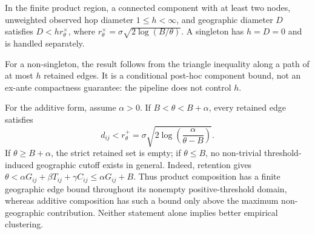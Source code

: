 \documentclass[runningheads]{llncs}
\begin{document}
\begin{corollary}
In the finite product region, a connected component with at least two nodes,
unweighted observed hop diameter $1\leq h<\infty$, and geographic diameter
$D$ satisfies $D<hr_\theta^\times$, where
$r_\theta^\times=\sigma\sqrt{2\log(B/\theta)}$. A singleton has $h=D=0$ and
is handled separately.
\end{corollary}
For a non-singleton, the result follows from the triangle inequality along a
path of at most $h$ retained edges. It is a conditional post-hoc component
bound, not an ex-ante compactness guarantee: the pipeline does not control
$h$.

For the additive form, assume $\alpha>0$. If
$B<\theta<B+\alpha$, every retained edge satisfies
\[
d_{ij}<r_\theta^+
=\sigma\sqrt{2\log\!\left(\frac{\alpha}{\theta-B}\right)}.
\]
If $\theta\ge B+\alpha$, the strict retained set is empty; if
$\theta\le B$, no non-trivial threshold-induced geographic cutoff exists in
general. Indeed, retention gives
$\theta<\alpha G_{ij}+\beta T_{ij}+\gamma C_{ij}\le\alpha G_{ij}+B$.
Thus product composition has a finite geographic edge bound throughout its
nonempty positive-threshold domain, whereas additive composition has such a
bound only above the maximum non-geographic contribution. Neither statement
alone implies better empirical clustering.
\end{document}

